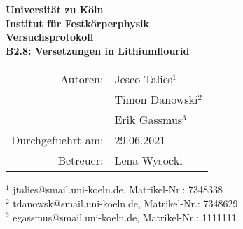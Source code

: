 \documentclass{article}
\begin{document}
 
 
\thispagestyle{empty}
\vspace*{\fill}
\begin{center}
	\Huge
	\textbf{Universität zu Köln}\\
	\LARGE
	\textbf{Institut für Festkörperphysik}\\
	\vspace{2cm}
	\textbf{Versuchsprotokoll}\\  
	\vspace{0.5cm}
	\large
	\textbf{B2.8: Versetzungen in Lithiumflourid}\\
	\normalsize
	\vspace{2cm}
	\begin{tabular}{r l}
		Autoren: 	& Jesco Talies$^1$\\
					& Timon Danowski$^2$\\
                    & Erik Gassmus$^3$\\
		Durchgefuehrt am:	& 29.06.2021\\
		Betreuer:	& Lena Wysocki
	\end{tabular}
\end{center}
\vfill\footnotesize
$^1$ jtalies@smail.uni-koeln.de, Matrikel-Nr.:  7348338\\
$^2$ tdanowsk@smail.uni-koeln.de, Matrikel-Nr.: 7348629\\
$^3$ egassmus@smail.uni-koeln.de, Matrikel-Nr.: 1111111\\
\normalsize

\newpage
\thispagestyle{empty}
\tableofcontents
\clearpage
\setcounter{page}{1}
  
   
  


% 

%
\end{document}
